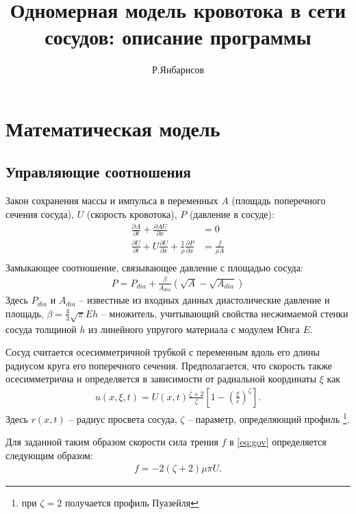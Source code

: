 \documentclass[12pt]{article}
\title{Одномерная модель кровотока в сети сосудов: описание программы}
\author{Р.Янбарисов}
\date{}
\begin{document}
\maketitle

\section{Математическая модель}\label{sec:model}

\subsection{Управляющие соотношения}\label{sec:gov}

Закон сохранения массы и импульса в переменных $A$ (площадь поперечного сечения сосуда), $U$ (скорость кровотока), $P$ (давление в сосуде):
\begin{align}\label{eq:gov}
	\frac{\partial A}{\partial t} + \frac{\partial AU}{\partial x} &= 0 \\
	\frac{\partial U}{\partial t} + U \frac{\partial U}{\partial x} + \frac{1}{\rho}\frac{\partial P}{\partial x} &= \frac{f}{\rho A} \\
\end{align}
Замыкающее соотношение, связывающее давление с площадью сосуда:
\begin{align}\label{eq:pressure}
	P = P_{dia} + \frac{\beta}{A_{dia}} \left( \sqrt{A} - \sqrt{A_{dia}} \right)
\end{align}
Здесь $P_{dia}$ и $A_{dia}$ -- известные из входных данных диастолические давление и площадь, $\beta = \frac{4}{3} \sqrt{\pi} E h$ -- множитель, учитывающий свойства несжимаемой стенки сосуда толщиной $h$ из линейного упругого материала с модулем Юнга $E$.

Сосуд считается осесимметричной трубкой с переменным вдоль его длины радиусом круга его поперечного сечения.
Предполагается, что скорость также осесимметрична и определяется в зависимости от радиальной координаты $\xi$ как
\begin{align*}
	u(x,\xi,t) = U(x,t) \frac{\zeta+2}{\zeta} \left[ 1 - \left(\frac{\xi}{r}\right)^\zeta \right].
\end{align*}
Здесь $r(x,t)$ -- радиус просвета сосуда, $\zeta$ -- параметр, определяющий профиль \footnote{при $\zeta = 2$ получается профиль Пуазейля}.

Для заданной таким образом скорости сила трения $f$ в \eqref{eq:gov} определяется следующим образом:
\begin{align}\label{eq:friction}
	f = -2 (\zeta+2) \mu \pi U.
\end{align}
 
\end{document}
